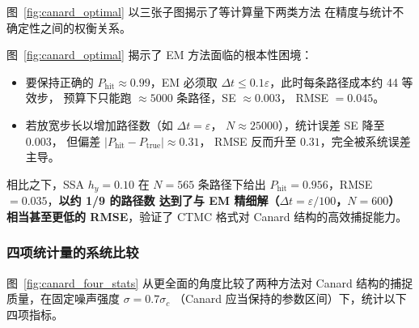 图~\ref{fig:canard_optimal} 以三张子图揭示了等计算量下两类方法
在精度与统计不确定性之间的权衡关系。


图~\ref{fig:canard_optimal} 揭示了 EM 方法面临的根本性困境：

\begin{itemize}
	\item 要保持正确的 $P_\mathrm{hit} \approx 0.99$，EM 必须取
	$\Delta t \leq 0.1\varepsilon$，此时每条路径成本约 44 等效步，
	预算下只能跑 $\approx 5000$ 条路径，SE $\approx 0.003$，
	RMSE $= 0.045$。
	\item 若放宽步长以增加路径数（如 $\Delta t = \varepsilon$，
	$N \approx 25000$），统计误差 SE 降至 $0.003$，
	但偏差 $|P_\mathrm{hit} - P_\mathrm{true}| \approx 0.31$，
	RMSE 反而升至 $0.31$，完全被系统误差主导。
\end{itemize}

相比之下，SSA $h_y=0.10$ 在 $N=565$ 条路径下给出
$P_\mathrm{hit}=0.956$，RMSE $=0.035$，\textbf{以约 1/9 的路径数
	达到了与 EM 精细解（$\Delta t=\varepsilon/100$，$N=600$）
	相当甚至更低的 RMSE}，验证了 CTMC 格式对 Canard 结构的高效捕捉能力。

\subsubsection{四项统计量的系统比较}

图~\ref{fig:canard_four_stats} 从更全面的角度比较了两种方法对
Canard 结构的捕捉质量，在固定噪声强度 $\sigma = 0.7\sigma_c$
（Canard 应当保持的参数区间）下，统计以下四项指标。


